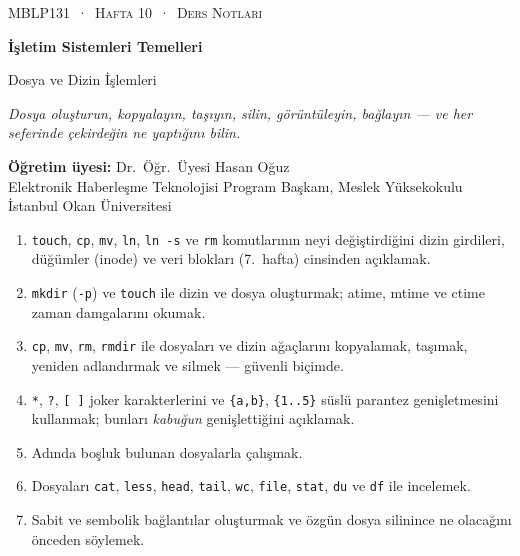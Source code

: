 \documentclass[11pt,a4paper]{article}
\newcommand{\cmd}[1]{\texttt{#1}}
\begin{document}
\setlength{\parskip}{0.45em}
\setlength{\emergencystretch}{3em}
\thispagestyle{empty}
\begin{tcolorbox}[enhanced,colback=dark,colframe=dark,arc=0pt,boxrule=0pt,
  left=18pt,right=18pt,top=20pt,bottom=20pt,coltext=white]
{\small\color{mint}\textsc{MBLP131 \,·\, Hafta 10 \,·\, Ders Notları}}\par\medskip
{\headfont\fontsize{26}{30}\selectfont\bfseries İşletim Sistemleri Temelleri}\par\medskip
{\large Dosya ve Dizin İşlemleri}\par\smallskip
{\small\itshape\color{white!70} Dosya oluşturun, kopyalayın, taşıyın, silin, görüntüleyin, bağlayın --- ve her seferinde çekirdeğin ne yaptığını bilin.}
\end{tcolorbox}

\vspace{0.4em}
\begin{minipage}[t]{0.70\linewidth}
\small
\textbf{Öğretim üyesi:} Dr.\ Öğr.\ Üyesi Hasan Oğuz\\
Elektronik Haberleşme Teknolojisi Program Başkanı, Meslek Yüksekokulu\\
İstanbul Okan Üniversitesi
\end{minipage}

\vspace{0.8em}
\begin{keyidea}
\begin{enumerate}[leftmargin=1.4em]
  \item \cmd{touch}, \cmd{cp}, \cmd{mv}, \cmd{ln}, \cmd{ln -s} ve \cmd{rm} komutlarının neyi değiştirdiğini dizin girdileri, düğümler (inode) ve veri blokları (7.~hafta) cinsinden açıklamak.
  \item \cmd{mkdir} (\cmd{-p}) ve \cmd{touch} ile dizin ve dosya oluşturmak; atime, mtime ve ctime zaman damgalarını okumak.
  \item \cmd{cp}, \cmd{mv}, \cmd{rm}, \cmd{rmdir} ile dosyaları ve dizin ağaçlarını kopyalamak, taşımak, yeniden adlandırmak ve silmek --- güvenli biçimde.
  \item \texttt{*}, \texttt{?}, \texttt{[\,]} joker karakterlerini ve \texttt{\{a,b\}}, \texttt{\{1..5\}} süslü parantez genişletmesini kullanmak; bunları \emph{kabuğun} genişlettiğini açıklamak.
  \item Adında boşluk bulunan dosyalarla çalışmak.
  \item Dosyaları \cmd{cat}, \cmd{less}, \cmd{head}, \cmd{tail}, \cmd{wc}, \cmd{file}, \cmd{stat}, \cmd{du} ve \cmd{df} ile incelemek.
  \item Sabit ve sembolik bağlantılar oluşturmak ve özgün dosya silinince ne olacağını önceden söylemek.
\end{enumerate}
\end{keyidea}
\end{document}
